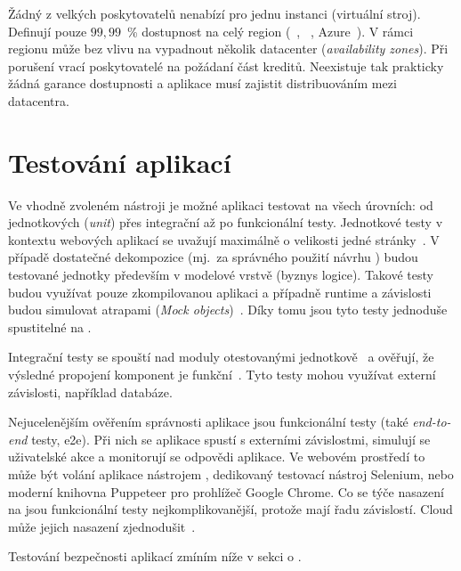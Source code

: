         Žádný z velkých poskytovatelů nenabízí  pro jednu instanci (virtuální stroj). Definují pouze $99,99$~\% dostupnost na celý region (~\cite{aws-sla}, ~\cite{gcp-sla}, Azure~\cite{azure-sla}). V rámci regionu může bez vlivu na  vypadnout několik datacenter (\textit{availability zones}). Při porušení  vrací poskytovatelé na požádaní část kreditů. Neexistuje tak prakticky žádná garance dostupnosti a aplikace musí  zajistit distribuováním mezi datacentra.

    \section*{Testování aplikací}
        Ve vhodně zvoleném \CI nástroji je možné aplikaci testovat na všech úrovních: od jednotkových (\textit{unit}) přes integrační až po funkcionální testy. Jednotkové testy v kontextu webových aplikací se uvažují maximálně o velikosti jedné stránky~\cite{testing-web-apps}. V případě dostatečné dekompozice (mj.~za správného použití návrhu ) budou testované jednotky především v modelové vrstvě (byznys logice). Takové testy budou využívat pouze zkompilovanou aplikaci a případně runtime a závislosti budou simulovat atrapami (\textit{Mock objects})~\cite{mocks}. Díky tomu jsou tyto testy jednoduše spustitelné na \CI.

        Integrační testy se spouští nad moduly otestovanými jednotkově~\cite{ould1986testing} a ověřují, že výsledné propojení komponent je funkční~\cite{integration-tests}. Tyto testy mohou využívat externí závislosti, například databáze.

        Nejucelenějším ověřením správnosti aplikace jsou funkcionální testy (také \textit{end-to-end} testy, e2e). Při nich se aplikace spustí s externími závislostmi, simulují se uživatelské akce a monitorují se odpovědi aplikace. Ve webovém prostředí to může být volání aplikace nástrojem , dedikovaný testovací nástroj Selenium, nebo moderní knihovna Puppeteer pro prohlížeč Google Chrome. Co se týče nasazení na \CI jsou funkcionální testy nejkomplikovanější, protože mají řadu závislostí. Cloud může jejich nasazení zjednodušit~\cite{gcp-headless}.


        Testování bezpečnosti aplikací zmíním níže v sekci o .

